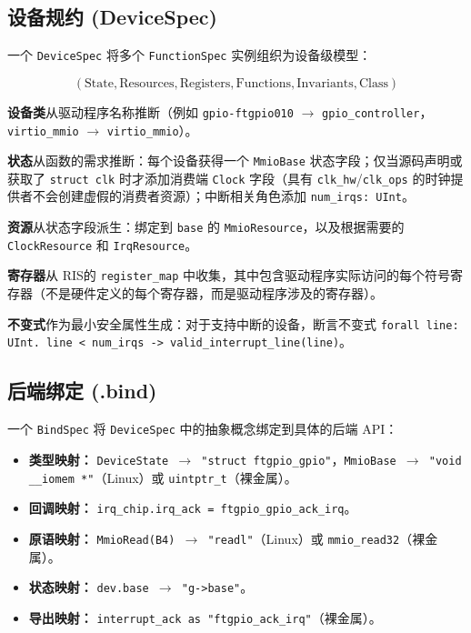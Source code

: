 \documentclass[sigplan, screen, review, anonymous]{acmart}
\newcommand{\rislang}{RIS}
\begin{document}
\subsection{设备规约 (DeviceSpec)}

一个 \texttt{DeviceSpec} 将多个 \texttt{FunctionSpec} 实例组织为设备级模型：

\[
(\text{State}, \text{Resources}, \text{Registers}, \text{Functions}, \text{Invariants}, \text{Class})
\]

\textbf{设备类}从驱动程序名称推断（例如 \texttt{gpio-ftgpio010} $\rightarrow$ \texttt{gpio\_controller}，\texttt{virtio\_mmio} $\rightarrow$ \texttt{virtio\_mmio}）。

\textbf{状态}从函数的需求推断：每个设备获得一个 \texttt{MmioBase} 状态字段；仅当源码声明或获取了 \texttt{struct clk} 时才添加消费端 \texttt{Clock} 字段（具有 \texttt{clk\_hw}/\texttt{clk\_ops} 的时钟提供者不会创建虚假的消费者资源）；中断相关角色添加 \texttt{num\_irqs: UInt}。

\textbf{资源}从状态字段派生：绑定到 \texttt{base} 的 \texttt{MmioResource}，以及根据需要的 \texttt{ClockResource} 和 \texttt{IrqResource}。

\textbf{寄存器}从 \rislang 的 \texttt{register\_map} 中收集，其中包含驱动程序实际访问的每个符号寄存器（不是硬件定义的每个寄存器，而是驱动程序涉及的寄存器）。

\textbf{不变式}作为最小安全属性生成：对于支持中断的设备，断言不变式 \texttt{forall line: UInt. line < num\_irqs -> valid\_interrupt\_line(line)}。

\subsection{后端绑定 (.bind)}

一个 \texttt{BindSpec} 将 \texttt{DeviceSpec} 中的抽象概念绑定到具体的后端 API：

\begin{itemize}
\item \textbf{类型映射：} \texttt{DeviceState $\rightarrow$ "struct ftgpio\_gpio"}，\texttt{MmioBase $\rightarrow$ "void \_\_iomem *"}（Linux）或 \texttt{uintptr\_t}（裸金属）。
\item \textbf{回调映射：} \texttt{irq\_chip.irq\_ack = ftgpio\_gpio\_ack\_irq}。
\item \textbf{原语映射：} \texttt{MmioRead(B4) $\rightarrow$ "readl"}（Linux）或 \texttt{mmio\_read32}（裸金属）。
\item \textbf{状态映射：} \texttt{dev.base $\rightarrow$ "g->base"}。
\item \textbf{导出映射：} \texttt{interrupt\_ack as "ftgpio\_ack\_irq"}（裸金属）。
\end{itemize}
\end{document}
